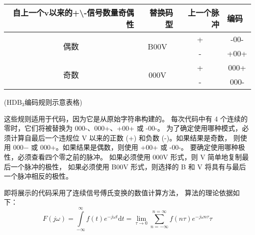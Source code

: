 \documentclass[AutoFakeBold]{LZUThesis}
\begin{document}
\begin{table}[]
    \begin{center}
        \begin{threeparttable}
        \begin{tabular}{|c|c|c|c|}
    \hline
    \multicolumn{1}{|r|}{自上一个v以来的+\textbackslash{}-信号数量奇偶性} & \multicolumn{1}{r|}{替换码型} & \multicolumn{1}{r|}{上一个脉冲} & \multicolumn{1}{l|}{编码} \\ \hline
    \multirow{2}{*}{偶数}                                     & \multirow{2}{*}{B00V}     & +                          & -00-                    \\ \cline{3-4} 
                                                            &                           & -                          & +00+                    \\ \hline
    \multirow{2}{*}{奇数}                                     & \multirow{2}{*}{000V}     & +                          & 000+                    \\ \cline{3-4} 
                                                            &                           & -                          & 000-                    \\ \hline
    \end{tabular}

\begin{tablenotes}
    \footnotesize
    \item \begin{center}($\mathrm{HDB_3}$编码规则示意表格)\end{center}
  \end{tablenotes}
\end{threeparttable}
\end{center}
    \end{table}


    这些规则适用于代码，因为它是从原始字符串构建的。
    每次代码中有 4 个连续的零时，它们将被替换为 000-、000+、+00+ 或 -00-。
    为了确定使用哪种模式，必须计算自最后一个违规位 V 以来的正数 (+) 和负数 (-)。如果结果是奇数，
    则使用 000− 或 000+。如果结果是偶数，则使用 +00+ 或 -00-。
    要确定使用哪种极性，必须查看四个零之前的脉冲。
    如果必须使用 000V 形式，则 V 简单地复制最后一个脉冲的极性，
    如果必须使用 B00V 形式，则选择的 B 和 V 将具有与最后一个脉冲相反的极性。

即将展示的代码采用了连续信号傅氏变换的数值计算方法\cite{ssmat}，
算法的理论依据如下：
\begin{equation}
    F(j\omega)  = \int\limits_{-\infty}^{\infty} f(t) e^{-j\omega t} \mathrm{d}t =
    \lim\limits_{\tau \to 0} \sum\limits_{n = -\infty}^{n = \infty} f(n\tau) e^{-j\omega n\tau} \tau
\end{equation}
\end{document}
